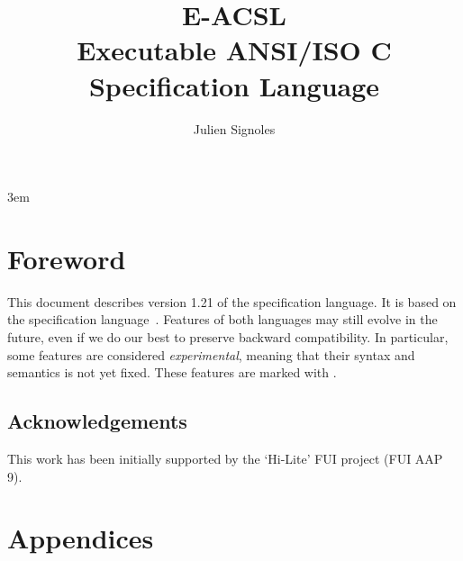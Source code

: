 \documentclass{frama-c-book}
\title{
  \huge %
  E-ACSL \\
  \medskip
  Executable ANSI/ISO C Specification Language
}
\author{Julien Signoles}
\newcommand{\eacsllangversion}{1.21\xspace}
\newcommand{\version}{\eacsllangversion\xspace}
\begin{document}
\sloppy
\emergencystretch 3em

\maketitle

\cleardoublepage
{}
\label{chap:contents}
\tableofcontents

\chapter*{Foreword}

This document describes version \version of the \eacsl specification
language. It is based on the \acsl specification language~\cite{acsl}. Features
of both languages may still evolve in the future, even if we do our best to
preserve backward compatibility. In particular, some features are considered
\emph{experimental}, meaning that their syntax and semantics is not yet fixed.
These features are marked with \experimental.

\section*{Acknowledgements}

\insertpeople

\medskip

This work has been initially supported by the ‘Hi-Lite’ FUI project (FUI AAP 9).










\appendix

\chapter{Appendices}
\label{chap:appendix}



\cleardoublepage
{}



\cleardoublepage
{}
\listoffigures

\cleardoublepage
{}
\printindex
\end{document}
